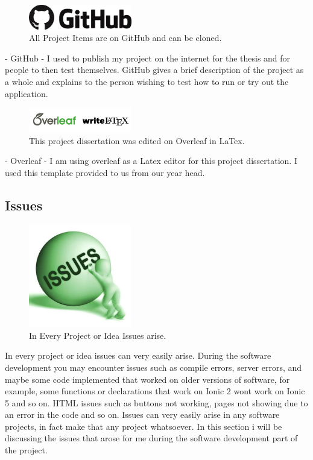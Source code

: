 \begin{figure}[h!]
	\caption{All Project Items are on GitHub and can be cloned.}
	\label{image:github1}
	\centering
	\includegraphics[width=0.4\textwidth]{images/github.png}
\end{figure}

- GitHub - I used to publish my project on the internet for the thesis and for people to then test themselves. GitHub gives a brief description of the project as a whole and explains to the person wishing to test how to run or try out the application. 
\newline

\begin{figure}[h!]
	\caption{This project dissertation was edited on Overleaf in LaTex.}
	\label{image:overleaf-latex}
	\centering
	\includegraphics[width=0.4\textwidth]{images/overleaf-latex.png}
\end{figure}

- Overleaf - I am using overleaf as a Latex editor for this project dissertation. I used this template provided to us from our year head.

\subsection{Issues}

\begin{figure}[h!]
	\caption{In Every Project or Idea Issues arise.}
	\label{image:issues}
	\centering
	\includegraphics[width=0.4\textwidth]{images/issues.jpg}
\end{figure}

In every project or idea issues can very easily arise. During the software development you may encounter issues such as compile errors, server errors, and maybe some code implemented that worked on older versions of software, for example, some functions or declarations that work on Ionic 2 wont work on Ionic 5 and so on. HTML issues such as buttons not working, pages not showing due to an error in the code and so on. Issues can very easily arise in any software projects, in fact make that any project whatsoever. In this section i will be discussing the issues that arose for me during the software development part of the project. 
\newline

